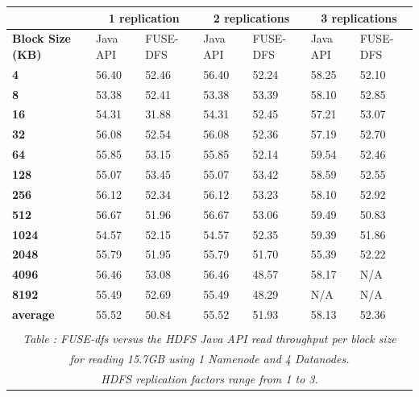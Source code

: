 \documentclass[11]{article}
\begin{document}
\begin{center}
\begin{tabular}[tbp]{| l || l | l || l | l || l | l |}

\hline
\hfill & \multicolumn{2}{|c||}{1 replication} & \multicolumn{2}{|c||}{2 replications} & \multicolumn{2}{|c|}{3 replications} \\
\hline
\hline
\textbf{Block Size (KB)}	& Java API & FUSE-DFS & Java API & FUSE-DFS & Java API & FUSE-DFS\\
\hline
\textbf{4}	&	56.40	&	52.46	&	56.40	&	52.24	&	58.25	&	52.10	\\
\textbf{8}	&	53.38	&	52.41	&	53.38	&	53.39	&	58.10	&	52.85	\\
\textbf{16}	&	54.31	&	31.88	&	54.31	&	52.45	&	57.21	&	53.07	\\
\textbf{32}	&	56.08	&	52.54	&	56.08	&	52.36	&	57.19	&	52.70	\\
\textbf{64}	&	55.85	&	53.15	&	55.85	&	52.14	&	59.54	&	52.46	\\
\textbf{128}	&	55.07	&	53.45	&	55.07	&	53.42	&	58.59	&	52.55	\\
\textbf{256}	&	56.12	&	52.34	&	56.12	&	53.23	&	58.10	&	52.92	\\
\textbf{512}	&	56.67	&	51.96	&	56.67	&	53.06	&	59.49	&	50.83	\\
\textbf{1024}	&	54.57	&	52.15	&	54.57	&	52.35	&	59.39	&	51.86	\\
\textbf{2048}	&	55.79	&	51.95	&	55.79	&	51.70	&	55.39	&	52.22	\\
\textbf{4096}	&	56.46	&	53.08	&	56.46	&	48.57	&	58.17	&	N/A	\\
\textbf{8192}	&	55.49	&	52.69	&	55.49	&	48.29	&	N/A	&	N/A	\\
\hline
\hline
\textbf{average} &	55.52	&	50.84	&	55.52	&	51.93	&	58.13	&	52.36	\\
\hline
\multicolumn{7}{c}{\hfill}\\
\multicolumn{7}{c}{\emph{Table : FUSE-dfs versus the HDFS Java API \textit{read} throughput per block size }}\\
\multicolumn{7}{c}{\emph{for reading 15.7GB using \textit{1 Namenode} and \textit{4 Datanodes}.}}\\
\multicolumn{7}{c}{\emph{HDFS replication factors range from 1 to 3.}}\\
\end{tabular}
\end{center}
\end{document}
